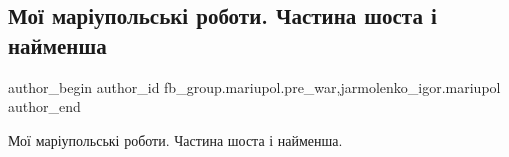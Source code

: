  
 
 
 
 

\subsection{Мої маріупольські роботи. Частина шоста і найменша}
\label{sec:04_02_2023.fb.fb_group.mariupol.pre_war.8.mo__mar_upolsk__robo}
 
\ifcmt
 author_begin
   author_id fb_group.mariupol.pre_war,jarmolenko_igor.mariupol
 author_end
\fi

Мої маріупольські роботи. Частина шоста і найменша.

